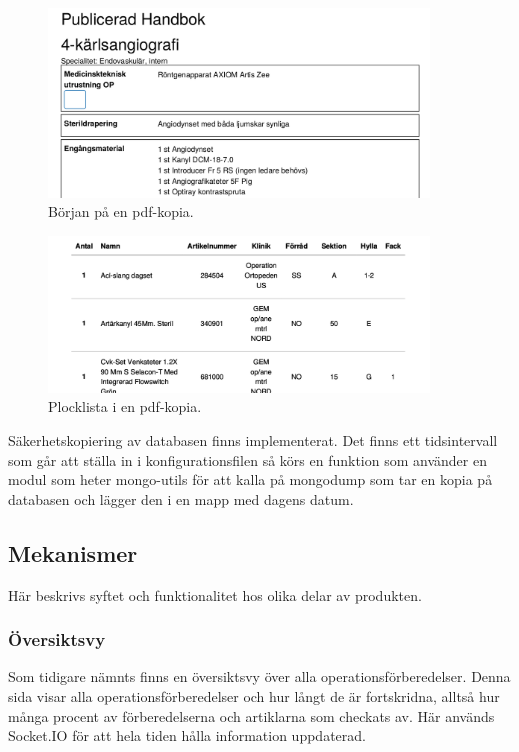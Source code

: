 \begin{figure}
  \centering
  \includegraphics[width=0.9\textwidth]{images/pdf-start.png}
  \caption{Början på en pdf-kopia.}
  \label{fig:pdf-start}
\end{figure}

\begin{figure}
  \centering
  \includegraphics[width=0.9\textwidth]{images/pdf-end.png}
  \caption{Plocklista i en pdf-kopia.}
  \label{fig:pdf-end}
\end{figure}

Säkerhetskopiering av databasen finns implementerat. Det finns ett tidsintervall som går att ställa in i konfigurationsfilen så körs en funktion som använder en modul som heter mongo-utils för att kalla på mongodump som tar en kopia på databasen och lägger den i en mapp med dagens datum. 

\subsection{Mekanismer}
Här beskrivs syftet och funktionalitet hos olika delar av produkten.

\subsubsection{Översiktsvy}
Som tidigare nämnts finns en översiktsvy över alla operationsförberedelser.
Denna sida visar alla operationsförberedelser och hur långt de är fortskridna, alltså hur många procent av förberedelserna och artiklarna som checkats av.
Här används Socket.IO för att hela tiden hålla information uppdaterad.


